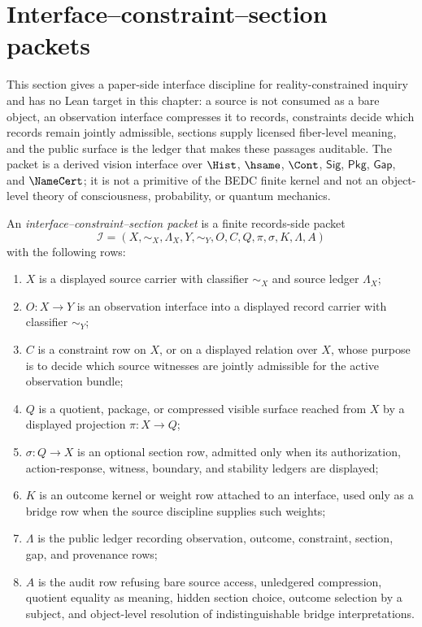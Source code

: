\section{Interface--constraint--section packets}
\label{sec:interface-constraint-section-packets}

\begin{remark}
\label{rem:interface-constraint-section-paper-side-status}
This section gives a paper-side interface discipline for
reality-constrained inquiry and has no Lean target in this chapter: a
source is not consumed as a bare object, an observation interface
compresses it to records, constraints decide which records remain jointly
admissible, sections supply licensed fiber-level meaning, and the public
surface is the ledger that makes these passages auditable. The packet is
a derived vision interface over $\Hist$, $\hsame$, $\Cont$,
$\mathsf{Sig}$, $\mathsf{Pkg}$, $\mathsf{Gap}$, and $\NameCert$; it is
not a primitive of the BEDC finite kernel and not an object-level theory
of consciousness, probability, or quantum mechanics.
\end{remark}

\begin{definition}
\label{def:interface-constraint-section-packet}
An \emph{interface--constraint--section packet} is a finite records-side
packet
$$
\mathcal I=(X,\sim_X,\Lambda_X,Y,\sim_Y,O,C,Q,\pi,\sigma,K,\Lambda,A)
$$
with the following rows:
\begin{enumerate}
\item $X$ is a displayed source carrier with classifier $\sim_X$ and
source ledger $\Lambda_X$;
\item $O:X\to Y$ is an observation interface into a displayed record
carrier with classifier $\sim_Y$;
\item $C$ is a constraint row on $X$, or on a displayed relation over
$X$, whose purpose is to decide which source witnesses are jointly
admissible for the active observation bundle;
\item $Q$ is a quotient, package, or compressed visible surface reached
from $X$ by a displayed projection $\pi:X\to Q$;
\item $\sigma:Q\to X$ is an optional section row, admitted only when its
authorization, action-response, witness, boundary, and stability ledgers
are displayed;
\item $K$ is an outcome kernel or weight row attached to an interface,
used only as a bridge row when the source discipline supplies such
weights;
\item $\Lambda$ is the public ledger recording observation, outcome,
constraint, section, gap, and provenance rows;
\item $A$ is the audit row refusing bare source access, unledgered
compression, quotient equality as meaning, hidden section choice,
outcome selection by a subject, and object-level resolution of
indistinguishable bridge interpretations.
\end{enumerate}
\end{definition}

